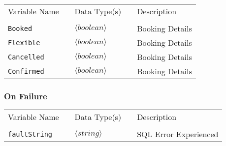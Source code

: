 \begin{tabular}{lllll}
Variable Name	&		&	Data Type(s)		&	&	Description	\\
				&	&	&	&	\\
\verb!Booked! & \hspace{15mm} & $\langle boolean\rangle $ & \hspace{15mm} & Booking Details \\
\verb!Flexible! & \hspace{15mm} & $\langle boolean\rangle $ & \hspace{15mm} & Booking Details\\
\verb!Cancelled! & \hspace{15mm} & $\langle boolean\rangle $ & \hspace{15mm} &  Booking Details\\
\verb!Confirmed! & \hspace{15mm} & $\langle boolean\rangle $ & \hspace{15mm} &  Booking Details\\
\end{tabular}
\subsubsection{On Failure}

\begin{tabular}{lllll}
Variable Name	&		&	Data Type(s)		&	&	Description	\\
				&	&	&	&	\\
\verb!faultString! & \hspace{15mm} & $\langle string\rangle $ & \hspace{15mm} & SQL Error Experienced \\
\end{tabular}
